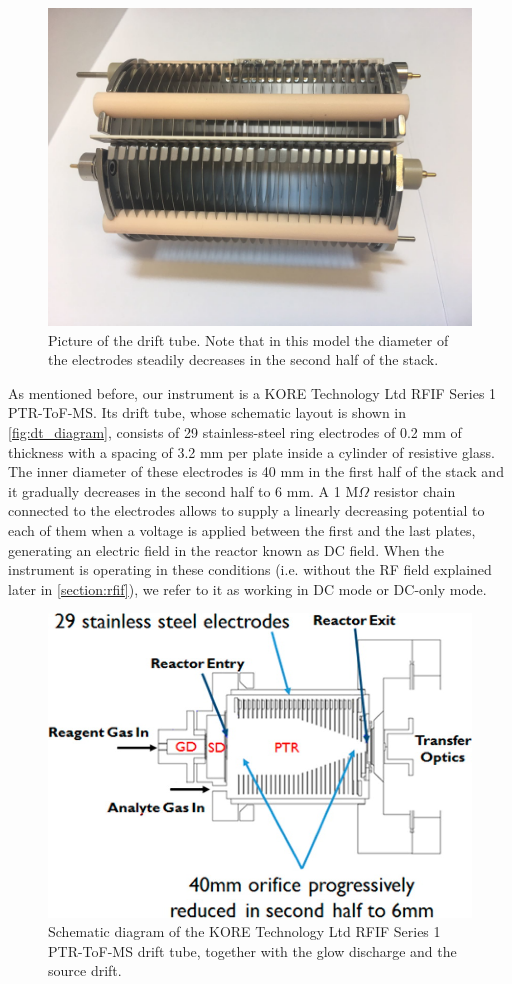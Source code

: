 \begin{figure}%
\centering
\includegraphics[width=0.6\linewidth]{pics/IMG-20170119-WA0008.png}
\centering
\caption[Picture of the drift tube.]{Picture of the drift tube. Note that in this model the diameter of the electrodes steadily decreases in the second half of the stack.}
\label{fig:dt}
\end{figure}


As mentioned before, our %
instrument is a KORE Technology Ltd RFIF Series 1 PTR-ToF-MS.
Its drift tube, whose schematic layout is shown in \autoref{fig:dt_diagram}, consists of 29 stainless-steel ring electrodes of 0.2 mm of thickness with a spacing of 3.2 mm per plate inside a cylinder of resistive glass.
The inner diameter of these electrodes is 40 mm in the first half of the stack and it gradually decreases in the second half to 6 mm.
A 1 M$\Omega$ resistor chain connected to the electrodes allows to supply a linearly decreasing potential to each of them when a voltage is applied between the first and the last plates, generating an electric field in the reactor known as DC field.
When the instrument is operating in these conditions (i.e. without the RF field explained later in \autoref{section:rfif}), we refer to it as working in DC mode or DC-only mode.
\begin{figure}[t]
\centering
\includegraphics[width=0.6\linewidth]{pics/ac-2016-02982x_0002.png}
\centering
\caption{Schematic diagram of the KORE Technology Ltd RFIF Series 1 PTR-ToF-MS drift tube, together with the glow discharge and the source drift.}
\label{fig:dt_diagram}
\end{figure}

